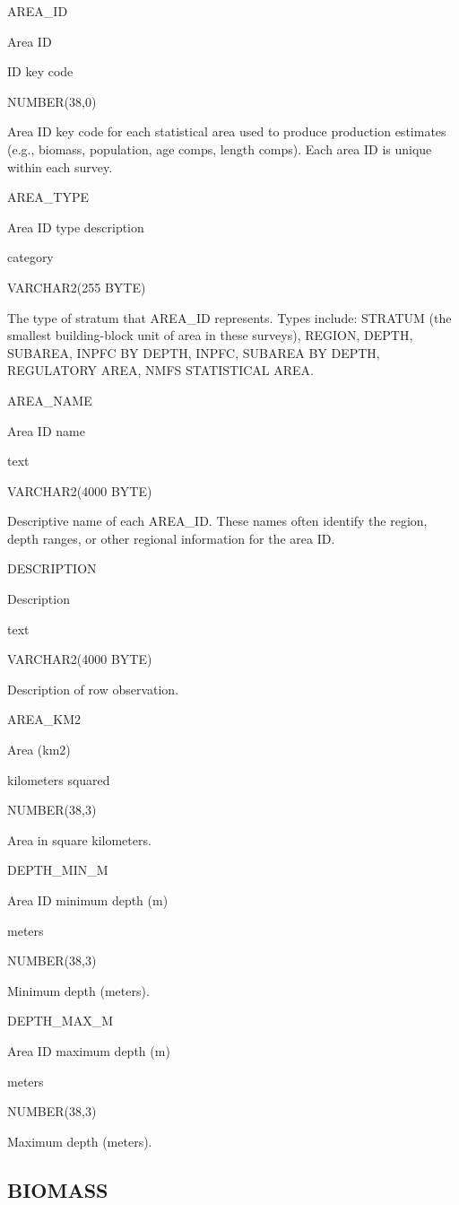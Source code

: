\documentclass[
  letterpaper,
  oneside,
  open=any]{scrbook}
\begin{document}
AREA\_ID

Area ID

ID key code

NUMBER(38,0)

Area ID key code for each statistical area used to produce production
estimates (e.g., biomass, population, age comps, length comps). Each
area ID is unique within each survey.

AREA\_TYPE

Area ID type description

category

VARCHAR2(255 BYTE)

The type of stratum that AREA\_ID represents. Types include: STRATUM
(the smallest building-block unit of area in these surveys), REGION,
DEPTH, SUBAREA, INPFC BY DEPTH, INPFC, SUBAREA BY DEPTH, REGULATORY
AREA, NMFS STATISTICAL AREA.

AREA\_NAME

Area ID name

text

VARCHAR2(4000 BYTE)

Descriptive name of each AREA\_ID. These names often identify the
region, depth ranges, or other regional information for the area ID.

DESCRIPTION

Description

text

VARCHAR2(4000 BYTE)

Description of row observation.

AREA\_KM2

Area (km2)

kilometers squared

NUMBER(38,3)

Area in square kilometers.

DEPTH\_MIN\_M

Area ID minimum depth (m)

meters

NUMBER(38,3)

Minimum depth (meters).

DEPTH\_MAX\_M

Area ID maximum depth (m)

meters

NUMBER(38,3)

Maximum depth (meters).

\subsection{BIOMASS}\label{biomass}
\end{document}
